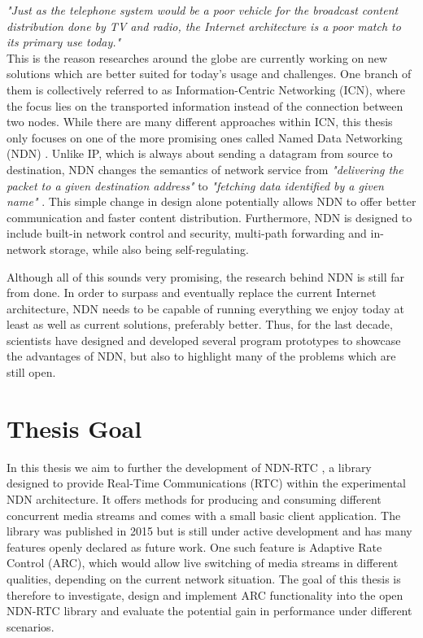\textit{ "Just as the telephone system would be a poor vehicle for the broadcast content distribution done by TV and radio, the Internet architecture is a poor match to its primary use today."} \\

This is the reason researches around the globe are currently working on new solutions which are better suited for today's usage and challenges. One branch of them is collectively referred to as Information-Centric Networking (ICN), where the focus lies on the transported information instead of the connection between two nodes. While there are many different approaches within ICN, this thesis only focuses on one of the more promising ones called Named Data Networking (NDN) \cite{ZEBJ10}. Unlike IP, which is always about sending a datagram from source to destination, NDN changes the semantics of network service from \textit{"delivering the packet to a given destination address"} to \textit{"fetching data identified by a given name"} \cite{ZABJ14}. This simple change in design alone potentially allows NDN to offer better communication and faster content distribution. Furthermore, NDN is designed to include built-in network control and security, multi-path forwarding and in-network storage, while also being self-regulating. \cite{ZEBJ10, ZABJ14}

Although all of this sounds very promising, the research behind NDN is still far from done. In order to surpass and eventually replace the current Internet architecture, NDN needs to be capable of running everything we enjoy today at least as well as current solutions, preferably better. Thus, for the last decade, scientists have designed and developed several program prototypes to showcase the advantages of NDN, but also to highlight many of the problems which are still open. 

\section{Thesis Goal}
In this thesis we aim to further the development of NDN-RTC \cite{GuBu15}, a library designed to provide Real-Time Communications (RTC) within the experimental NDN architecture. It offers methods for producing and consuming different concurrent media streams and comes with a small basic client application. The library was published in 2015 but is still under active development and has many features openly declared as future work. One such feature is Adaptive Rate Control (ARC), which would allow live switching of media streams in different qualities, depending on the current network situation. The goal of this thesis is therefore to investigate, design and implement ARC functionality into the open NDN-RTC library and evaluate the potential gain in performance under different scenarios.

